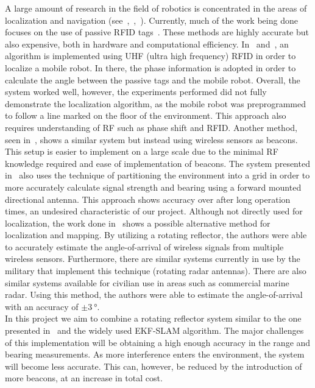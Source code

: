 \documentclass[letterpaper,12pt]{article}   %
\begin{document}
A large amount of research in the field of robotics is concentrated in the areas of localization and navigation (see~\cite{Martinelli2015},~\cite{DiGiampaolo2014},~\cite{Song2012}). Currently, much of the work being done focuses on the use of passive RFID tags~\cite{Martinelli2015}\cite{DiGiampaolo2014}. These methods are highly accurate but also expensive, both in hardware and computational efficiency. In~\cite{Martinelli2015} and~\cite{DiGiampaolo2014}, an algorithm is implemented using UHF (ultra high frequency) RFID in order to localize a mobile robot. In there, the phase information is adopted in order to calculate the angle between the passive tags and the mobile robot. Overall, the system worked well, however, the experiments performed did not fully demonstrate the localization algorithm, as the mobile robot was preprogrammed to follow a line marked on the floor of the environment. This approach also requires understanding of RF such as phase shift and RFID. Another method, seen in~\cite{Song2012}, shows a similar system but instead using wireless sensors as beacons. This setup is easier to implement on a large scale due to the minimal RF knowledge required and ease of implementation of beacons. The system presented in~\cite{Song2012} also uses the technique of partitioning the environment into a grid in order to more accurately calculate signal strength and bearing using a forward mounted directional antenna. This approach shows accuracy over after long operation times, an undesired characteristic of our project. Although not directly used for localization, the work done in~\cite{Hood2011} shows a possible alternative method for localization and mapping. By utilizing a rotating reflector, the authors were able to accurately estimate the angle-of-arrival of wireless signals from multiple wireless sensors. Furthermore, there are similar systems currently in use by the military that implement this technique (rotating radar antennas). There are also similar systems available for civilian use in areas such as commercial marine radar. Using this method, the authors were able to estimate the angle-of-arrival with an accuracy of $\pm \SI{3}{\degree}$.\\

In this project we aim to combine a rotating reflector system similar to the one presented in~\cite{Hood2011} and the widely used EKF-SLAM algorithm. The major challenges of this implementation will be obtaining a high enough accuracy in the range and bearing measurements. As more interference enters the environment, the system will become less accurate. This can, however, be reduced by the introduction of more beacons, at an increase in total cost.
\end{document}
